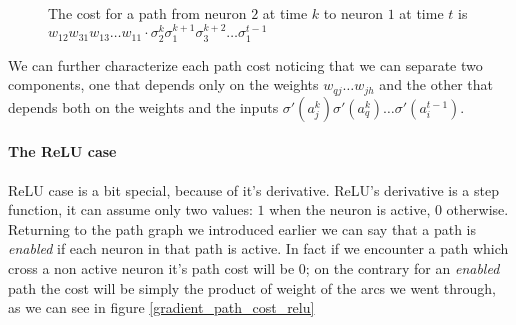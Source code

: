 \begin{figure}
\caption{The cost for a path from neuron $2$ at time $k$ to neuron $1$ at time $t$ is $w_{12}w_{31}w_{13}\hdots w_{11}\cdot \sigma_2^k \sigma_1^{k+1}\sigma_3^{k+2} \hdots \sigma_1^{t-1} $ }
\label{gradient_path_cost}
\end{figure}


We can further characterize each path cost noticing that we can separate two components, one that depends only on the weights $w_{qj} \hdots w_{jh}$ and the other that depends both on the weights and the inputs
$\sigma'(a_j^k)\sigma'(a_q^{k}) \hdots \sigma'(a_i^{t-1})$.


\paragraph{The ReLU case}
ReLU case is a bit special, because of it's derivative.
ReLU's derivative is a step function, it can assume only two values: $1$ when the neuron is active, $0$ otherwise.
Returning to the path graph we introduced earlier we can say that a path is \textit{enabled} if each neuron in that path is active. In fact if we
encounter a path which cross a non active neuron it's path cost will be 0; on the contrary for an \textit{enabled} path the cost will be simply the product
of weight of the arcs we went through, as we can see in figure \ref{gradient_path_cost_relu}


